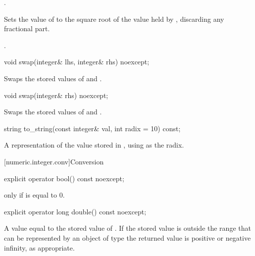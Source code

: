 \begin{itemdescr}
\requires {}.

\effects Sets the value of  to the square root of the value held by , discarding any fractional part.

\returns {}. 		
\end{itemdescr}

\begin{itemdecl}
void swap(integer& lhs, integer& rhs) noexcept;	
\end{itemdecl}

\begin{itemdescr}
\effects Swaps the stored values of  and .		
\end{itemdescr}

\begin{itemdecl}
void swap(integer& rhs) noexcept;	
\end{itemdecl}

\begin{itemdescr}
\effects Swaps the stored values of  and .		
\end{itemdescr}

\begin{itemdecl}
string to_string(const integer& val, int radix = 10) const;	
\end{itemdecl}

\begin{itemdescr}
\returns A  representation of the value stored in , using  as the radix.		
\end{itemdescr}

[numeric.integer.conv]{Conversion}

\begin{itemdecl}
explicit operator bool() const noexcept;	
\end{itemdecl}

\begin{itemdescr}
\returns {} only if  is equal to 0.		
\end{itemdescr}

\begin{itemdecl}
explicit operator long double() const noexcept;	
\end{itemdecl}

\begin{itemdescr}
\returns A value equal to the stored value of  . If the stored value is outside the range that can be represented by an object of type   the returned value is positive or negative infinity, as appropriate.		
\end{itemdescr}

